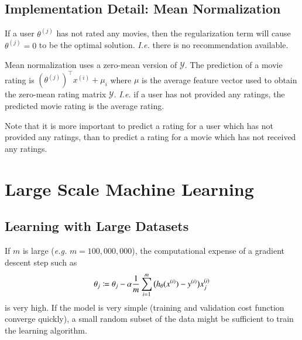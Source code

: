 \documentclass[a4paper,twoside,10pt]{article}
\begin{document}
\subsection{Implementation Detail: Mean Normalization}
If a user $\theta^{(j)}$ has not rated any movies, then the regularization term will cause $\theta^{(j)}=0$ to be the optimal solution. \emph{I.e.} there is no recommendation available.

Mean normalization uses a zero-mean version of $\mathcal{Y}$.
The prediction of a movie rating is $(\theta^{(j)})^\top x^{(i)}+\mu_i$ where $\mu$ is the average feature vector used to obtain the zero-mean rating matrix $\mathcal{Y}$.
\emph{I.e.} if a user has not provided any ratings, the predicted movie rating is the average rating.

Note that it is more important to predict a rating for a user which has not provided any ratings, than to predict a rating for a movie which has not received any ratings.

\section{Large Scale Machine Learning}
\subsection{Learning with Large Datasets}
If $m$ is large (\emph{e.g.} $m=100,000,000$), the computational expense of a gradient descent step such as
\begin{equation*}
  \theta_j\coloneqq\theta_j-\alpha\frac{1}{m}\displaystyle\sum_{i=1}^m\big(h_\theta(x^{(i)})-y^{(i)}\big)x^{(i)}_j
\end{equation*}
is very high.
If the model is very simple (training and validation cost function converge quickly), a small random subset of the data might be sufficient to train the learning algorithm.
\end{document}
